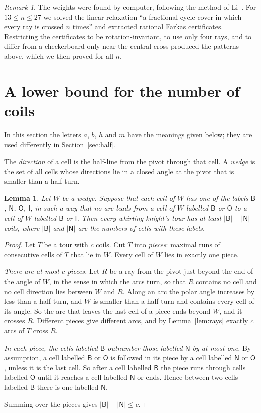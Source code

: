 \documentclass[11pt]{amsart}
\newtheorem{lemma}[theorem]{Lemma}
\theoremstyle{remark}
\newtheorem{remark}[theorem]{Remark}
\begin{document}
\begin{remark}
The weights were found by computer, following the method of Li~\cite{li}. For $13\le n\le27$ we solved the linear
relaxation ``a fractional cycle cover in which every ray is crossed $n$ times'' and extracted rational Farkas
certificates. Restricting the certificates to be
rotation-invariant, to use only four rays, and to differ from a checkerboard only near the central cross produced the
patterns above, which we then proved for all $n$.
\end{remark}

\section{A lower bound for the number of coils}\label{sec:lower}

In this section the letters $a$, $b$, $h$ and $m$ have the meanings given below; they are used differently in
Section~\ref{sec:half}.

The \emph{direction} of a cell is the half-line from the pivot through that cell. A \emph{wedge} is the set of all
cells whose directions lie in a closed angle at the pivot that is smaller than a half-turn.

\begin{lemma}\label{lem:wedge}
Let $W$ be a wedge. Suppose that each cell of $W$ has one of the labels $\mathsf B$, $\mathsf N$, $\mathsf O$,
$\mathsf I$, in such a way that no arc leads from a cell of $W$ labelled $\mathsf B$ or $\mathsf O$ to a cell of $W$
labelled $\mathsf B$ or $\mathsf I$. Then every whirling knight's tour has at least $|\mathsf B|-|\mathsf N|$ coils,
where $|\mathsf B|$ and $|\mathsf N|$ are the numbers of cells with these labels.
\end{lemma}
\begin{proof}
Let $T$ be a tour with $c$ coils. Cut $T$ into \emph{pieces}: maximal runs of consecutive cells of $T$ that lie in
$W$. Every cell of $W$ lies in exactly one piece.

\emph{There are at most $c$ pieces.} Let $R$ be a ray from the pivot just beyond the end of the angle of $W$, in the
sense in which the arcs turn, so that $R$ contains no cell and no cell direction lies between $W$ and $R$. Along an
arc the polar angle increases by less than a half-turn, and $W$ is smaller than a half-turn and contains every cell
of its angle. So the arc that leaves the last cell of a piece ends beyond $W$, and it crosses $R$. Different pieces give different arcs, and by
Lemma~\ref{lem:rays} exactly $c$ arcs of $T$ cross $R$.

\emph{In each piece, the cells labelled $\mathsf B$ outnumber those labelled $\mathsf N$ by at most one.} By
assumption, a cell labelled $\mathsf B$ or $\mathsf O$ is followed in its piece by a cell labelled $\mathsf N$ or
$\mathsf O$, unless it is the last cell. So after a cell labelled $\mathsf B$ the piece runs through cells labelled
$\mathsf O$ until it reaches a cell labelled $\mathsf N$ or ends. Hence between two cells labelled $\mathsf B$ there is
one labelled $\mathsf N$.

Summing over the pieces gives $|\mathsf B|-|\mathsf N|\le c$.
\end{proof}
\end{document}
